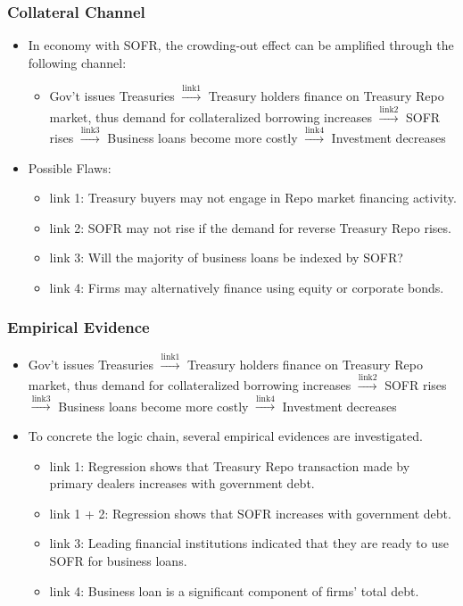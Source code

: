 \documentclass[10pt]{beamer}
\begin{document}
\begin{frame}
\frametitle{Collateral Channel}
\begin{itemize}
\item In economy with SOFR,  the crowding-out effect can be amplified through the following channel:
\begin{itemize}
\item Gov't issues Treasuries $\xrightarrow {\text{link1}}$ Treasury holders finance on Treasury Repo market,  thus demand for collateralized borrowing increases $\xrightarrow {\text{link2}}$ SOFR rises $\xrightarrow {\text{link3}}$ Business loans become more costly $\xrightarrow{\text{link4}}$ Investment decreases
\end{itemize}
\item Possible Flaws:
\begin{itemize}
\item link 1: Treasury buyers may not engage in Repo market financing activity.
\item link 2: SOFR may not rise if the demand for reverse Treasury Repo rises.
\item link 3: Will the majority of business loans be indexed by SOFR?
\item link 4: Firms may alternatively finance using equity or corporate bonds.
\end{itemize}
\end{itemize}
\end{frame}


\begin{frame}
\frametitle{Empirical Evidence}
\begin{itemize}
\item Gov't issues Treasuries $\xrightarrow {\text{link1}}$ Treasury holders finance on Treasury Repo market,  thus demand for collateralized borrowing increases $\xrightarrow {\text{link2}}$ SOFR rises $\xrightarrow {\text{link3}}$ Business loans become more costly $\xrightarrow{\text{link4}}$ Investment decreases
\item To concrete the logic chain,  several empirical evidences are investigated.
\begin{itemize}
\item link 1: Regression shows that Treasury Repo transaction made by primary dealers increases with government debt.
\item link 1 + 2: Regression shows that SOFR increases with government debt.
\item link 3: Leading financial institutions indicated that they are ready to use SOFR for business loans.
\item link 4: Business loan is a significant component of firms' total debt.
\end{itemize}
\end{itemize}
\end{frame}
\end{document}
